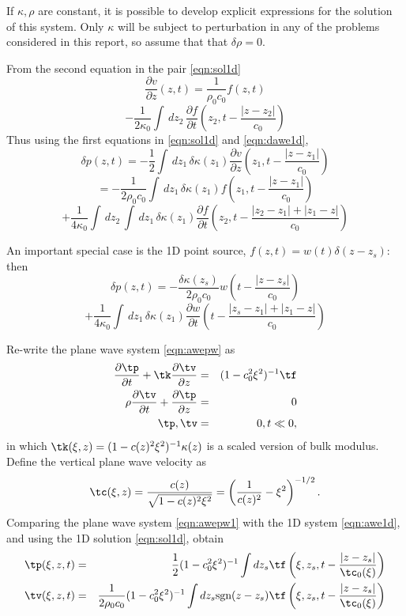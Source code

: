 If $\kappa, \rho $ are constant, it is possible to develop explicit
expressions for the solution of this system. Only $\kappa$ will be
subject to perturbation in any of the problems considered in this
report, so assume that that $\delta\rho=0$.

From the second equation in the pair \ref{eqn:sol1d}
\[
  \frac{\partial v}{\partial z}(z,t) = \frac{1}{\rho_0 c_0} f(z,t) 
\]
\begin{equation}
  \label{eqn:sol1ddvdz}
 - \frac{1}{2\kappa_0} \int\, dz_2\, \frac{\partial f}{\partial t}\left(z_2,t - \frac{|z-z_2|}{c_0}\right)
\end{equation}
Thus using the first equations in \ref{eqn:sol1d} and \ref{eqn:dawe1d}, 
\[
  \delta p(z,t) =- \frac{1}{2} \int \, dz_1 \, \delta
  \kappa(z_1)\frac{\partial v}{\partial z}\left(z_1,t - \frac{|z-z_1|}{c_0}\right)
\]
\[
  =-\frac{1}{2\rho_0c_0} \int \,dz_1\, \delta
  \kappa(z_1) f \left(z_1,t - \frac{|z-z_1|}{c_0}\right)
  \]
\begin{equation}
  \label{eqn:sol1ddp}
  + \frac{1}{4\kappa_0} \int\,dz_2 \, \int \,dz_1\,\delta 
  \kappa(z_1) \frac{\partial f}{\partial t}\left(z_2,t - \frac{|z_2-z_1|+|z_1-z|}{c_0}\right)
\end{equation}

An important special case is the 1D point source,
$f(z,t)=w(t)\delta(z-z_s)$: then
\[
  \delta p(z,t) = -\frac{\delta \kappa(z_s)}{2\rho_0c_0}w\left(t - \frac{|z-z_s|}{c_0}\right)
\]
\begin{equation}
  \label{eqn:sol1ddppw}
  +\frac{1}{4\kappa_0} \int \,dz_1\,\delta 
  \kappa(z_1) \frac{\partial w}{\partial t}\left(t - \frac{|z_s-z_1|+|z_1-z|}{c_0}\right)
\end{equation}

Re-write the plane wave system \ref{eqn:awepw} as
\begin{eqnarray}
\label{eqn:awepw1}
\frac{\partial \tp}{\partial t} + \tk\frac{\partial
  \tv}{\partial z} &=& (1-c_0^2\xi^2)^{-1}\tf \nonumber\\
\rho \frac{\partial \tv}{\partial t} + \frac{\partial \tp}{\partial
  z}&=&0\nonumber\\
\tp,\tv&=&0, t \ll 0,
\end{eqnarray}
in which $\tk(\xi,z)=(1-c(z)^2\xi^2)^{-1}\kappa(z)$ is a scaled version of
bulk modulus. Define the vertical plane wave velocity as
\[
\tc(\xi,z)=\frac{c(z)}{\sqrt{1-c(z)^2\xi^2}} =
\left(\frac{1}{c(z)^2}-\xi^2\right)^{-1/2}.
\]
Comparing the plane wave system \ref{eqn:awepw1} with the 1D system
\ref{eqn:awe1d}, and using the 1D solution \ref{eqn:sol1d}, obtain
\begin{eqnarray}
\label{eqn:solpw}
\tp(\xi,z,t) &=& \frac{1}{2}(1-c_0^2\xi^2)^{-1}\int dz_s \tf\left(\xi,z_s,t - \frac{|z-z_s|}{\tc_0(\xi)}\right) \nonumber \\
\tv(\xi,z,t) &=& \frac{1}{2\rho_0 c_0}(1-c_0^2\xi^2)^{-1} \int dz_s \mbox{sgn} (z-z_s)\tf\left(\xi,z_s,t - \frac{|z-z_s|}{\tc_0(\xi)}\right)
           \nonumber \\
\end{eqnarray}

